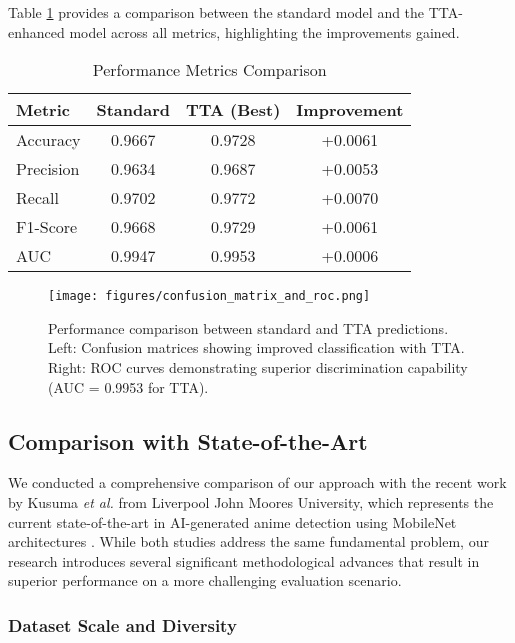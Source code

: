 \documentclass{article}
\begin{document}
Table \ref{tab:metric_comparison} provides a comparison between the standard model and the TTA-enhanced model across all metrics, highlighting the improvements gained.

\begin{table}[H]
\centering
\caption{Performance Metrics Comparison}
\label{tab:metric_comparison}
\begin{tabular}{lccc}
\hline
\textbf{Metric} & \textbf{Standard} & \textbf{TTA (Best)} & \textbf{Improvement} \\
\hline
Accuracy & 0.9667 & 0.9728 & +0.0061 \\
Precision & 0.9634 & 0.9687 & +0.0053 \\
Recall & 0.9702 & 0.9772 & +0.0070 \\
F1-Score & 0.9668 & 0.9729 & +0.0061 \\
AUC & 0.9947 & 0.9953 & +0.0006 \\
\hline
\end{tabular}
\end{table}

\begin{figure}[H]
\centering
\texttt{[image: figures/confusion\_matrix\_and\_roc.png]}
\caption{Performance comparison between standard and TTA predictions. Left: Confusion matrices showing improved classification with TTA. Right: ROC curves demonstrating superior discrimination capability (AUC = 0.9953 for TTA).}
\label{fig:performance_comparison}
\end{figure}

\subsection{Comparison with State-of-the-Art}

We conducted a comprehensive comparison of our approach with the recent work by Kusuma \textit{et al.} \cite{kusuma2024detection} from Liverpool John Moores University, which represents the current state-of-the-art in AI-generated anime detection using MobileNet architectures \cite{kusuma2024detection}\cite{kusuma2024detection}. While both studies address the same fundamental problem, our research introduces several significant methodological advances that result in superior performance on a more challenging evaluation scenario.

\subsubsection{Dataset Scale and Diversity}
\end{document}
